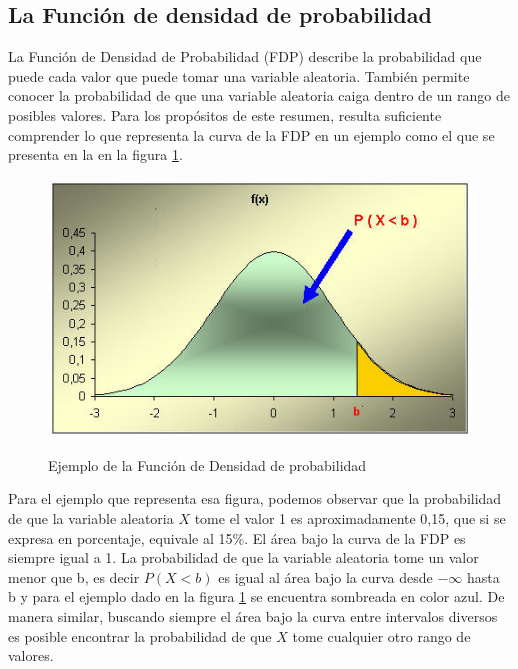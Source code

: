 \subsection{La Función de densidad de probabilidad}
La Función de Densidad de Probabilidad (FDP) describe la probabilidad que puede cada valor que puede tomar una variable aleatoria. También permite conocer la probabilidad de que una variable aleatoria caiga dentro de un rango de posibles valores. Para los propósitos de este resumen, resulta suficiente comprender lo que representa la curva de la FDP en un ejemplo como el que se presenta en la en la figura \ref{fig:fdp}. 


\begin{figure}[h!]
	\captionsetup{justification = raggedright, singlelinecheck = false}
	\caption{Ejemplo de la Función de Densidad de probabilidad} 
	\centering
	\includegraphics[scale=0.5]{Imagenes/probcon3.jpg}
	\label{fig:fdp}
\end{figure}

Para el ejemplo que representa esa figura, podemos observar que la probabilidad de que la variable aleatoria $X$ tome el valor 1 es aproximadamente 0,15, que si se expresa en porcentaje, equivale al 15\%. El área bajo la curva de la FDP es siempre igual a 1. La probabilidad de que la variable aleatoria tome un valor menor que b, es decir $P(X<b)$ es igual al área bajo la curva desde $-\infty$ hasta b y para el ejemplo dado en la figura \ref{fig:fdp} se encuentra sombreada en color azul. De manera similar, buscando siempre el área bajo la curva entre intervalos diversos es posible encontrar la probabilidad de que $X$ tome cualquier otro rango de valores.\\

